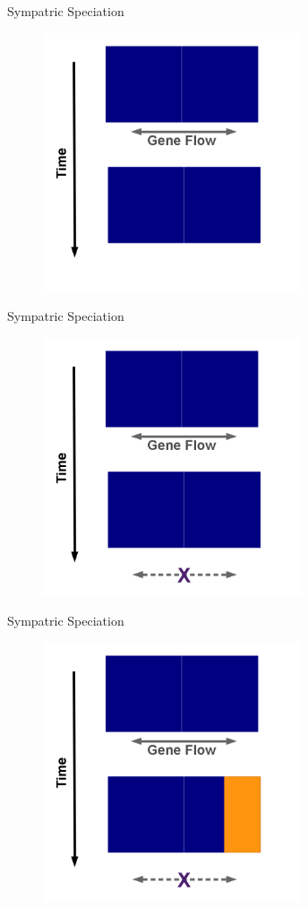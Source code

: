 \documentclass[t,10pt]{beamer}
\begin{document}
\begin{frame}[label={sec:orgheadline14}]{Sympatric Speciation}
\begin{figure}[htb]
\centering
\includegraphics[width=3in,height=3in]{./Figures/Sympatric_Speciation_Figure/png/4_Sympatric_Speciation.png}
\end{figure}
\end{frame}
\begin{frame}[label={sec:orgheadline15}]{Sympatric Speciation}
\begin{figure}[htb]
\centering
\includegraphics[width=3in,height=3in]{./Figures/Sympatric_Speciation_Figure/png/5_Sympatric_Speciation.png}
\end{figure}
\end{frame}
\begin{frame}[label={sec:orgheadline16}]{Sympatric Speciation}
\begin{figure}[htb]
\centering
\includegraphics[width=3in,height=3in]{./Figures/Sympatric_Speciation_Figure/png/6_Sympatric_Speciation.png}
\end{figure}
\end{frame}
\end{document}
